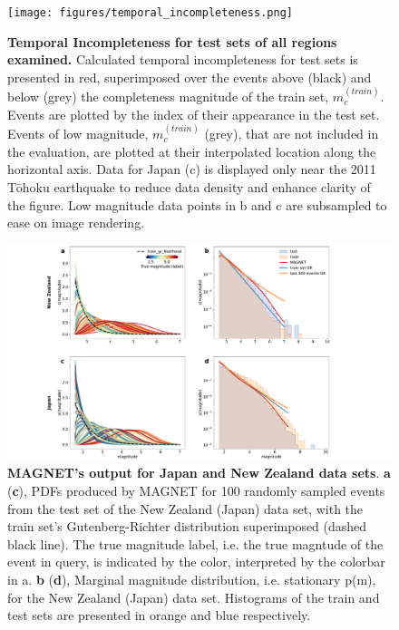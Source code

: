 \documentclass[pdflatex]{sn-jnl}
\begin{document}
\newpage
\begin{figure}[h!]
    \centering
        \texttt{[image: figures/temporal\_incompleteness.png]}
    \caption{
    \textbf{Temporal Incompleteness for test sets of all regions examined.} Calculated temporal incompleteness for test sets is presented in red, superimposed over the events above (black) and below (grey) the completeness magnitude of the train set, $m_c^{(train)}$. Events are plotted by the index of their appearance in the test set. Events of low magnitude, $m_c^{(train)}$ (grey), that are not included in the evaluation, are plotted at their interpolated location along the horizontal axis. Data for Japan (c) is displayed only near the 2011 Tōhoku earthquake to reduce data density and enhance clarity of the figure. Low magnitude data points in b and c are subsampled to ease on image rendering.
    }
    \label{fig:temp_incompleteness}
\end{figure}

\newpage
\begin{figure}[h!]
    \centering
    \includegraphics[width=1\textwidth]{figures/raw_results_em.pdf}
    \caption{
        \textbf{MAGNET’s output for Japan and New Zealand data sets}. \textbf{a} (\textbf{c}), PDFs produced by MAGNET for 100 randomly sampled events from the test set of the New Zealand (Japan) data set, with the train set’s Gutenberg-Richter distribution superimposed (dashed black line). The true magnitude label, i.e. the true magntude of the event in query, is indicated by the color, interpreted by the colorbar in a. \textbf{b} (\textbf{d}), Marginal magnitude distribution, i.e. stationary p(m), for the New Zealand (Japan) data set. Histograms of the train and test sets are presented in orange and blue respectively.
    }
    \label{fig:model_output_em}
\end{figure}
\end{document}
